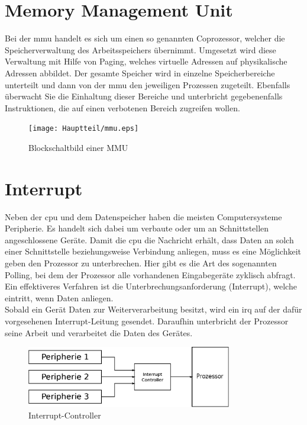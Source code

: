 \section{Memory Management Unit}\label{kap:mmu}

Bei der \ac{mmu} handelt es sich um einen so genannten Coprozessor, welcher die Speicherverwaltung des Arbeitsspeichers übernimmt. Umgesetzt wird diese Verwaltung mit
Hilfe von Paging, welches virtuelle Adressen auf physikalische Adressen abbildet. Der gesamte Speicher wird in einzelne Speicherbereiche unterteilt und dann von der
\ac{mmu} den jeweiligen Prozessen zugeteilt. Ebenfalls überwacht Sie die Einhaltung dieser Bereiche und unterbricht gegebenenfalls Instruktionen, die auf einen verbotenen
Bereich zugreifen wollen.\cite{itwissen}\\

\begin{figure}[H]
\centering
\texttt{[image: Hauptteil/mmu.eps]}
\caption{Blockschaltbild einer MMU}\label{fig:mmu}
\end{figure}

\section{Interrupt}\label{kap:interrupt}
Neben der \ac{cpu} und dem Datenspeicher haben die meisten Computersysteme Peripherie. Es handelt sich dabei um verbaute oder um an Schnittstellen angeschlossene Geräte.
Damit die \ac{cpu} die Nachricht erhält, dass Daten an solch einer Schnittstelle beziehungsweise Verbindung anliegen, muss es eine Möglichkeit geben den Prozessor zu
unterbrechen. Hier gibt es die Art des sogenannten Polling, bei dem der Prozessor alle vorhandenen Eingabegeräte zyklisch abfragt. Ein effektiveres Verfahren ist die
Unterbrechungsanforderung (Interrupt), welche eintritt, wenn Daten anliegen. \\
Sobald ein Gerät Daten zur Weiterverarbeitung besitzt, wird ein \ac{irq} auf der dafür vorgesehenen Interrupt-Leitung gesendet. Daraufhin unterbricht der Prozessor
seine Arbeit und verarbeitet die Daten des Gerätes.\cite{irq}\\

\begin{figure}[H]
\centering
\includegraphics[width=0.8\textwidth]{Hauptteil/irq.eps}
\caption{Interrupt-Controller}\label{fig:irq}
\end{figure}


